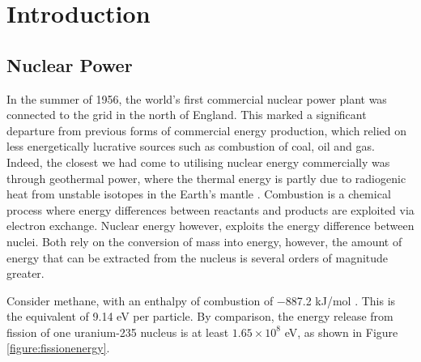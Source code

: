 \chapter{Introduction}

\section{Nuclear Power}

In the summer of 1956, the world's first commercial nuclear power plant was connected to the grid in the north of England. This marked a significant departure from previous forms of commercial energy production, which relied on less energetically lucrative sources such as combustion of coal, oil and gas. Indeed, the closest we had come to utilising nuclear energy commercially was through geothermal power, where the thermal energy is partly due to radiogenic heat from unstable isotopes in the Earth's mantle \cite{gando2011partial} . 
Combustion is a chemical process where energy differences between reactants and products are exploited via electron exchange. Nuclear energy however, exploits the energy difference between nuclei. Both rely on the conversion of mass into energy, however, the amount of energy that can be extracted from the nucleus is several orders of magnitude greater.

Consider methane, with an enthalpy of combustion of −887.2 kJ/mol \cite{thornton1917xv}. This is the equivalent of 9.14 eV per particle. By comparison, the energy release from fission of one uranium-235 nucleus is at least $1.65 \times 10^{8}$ eV, as shown in Figure \ref{figure:fissionenergy}.

